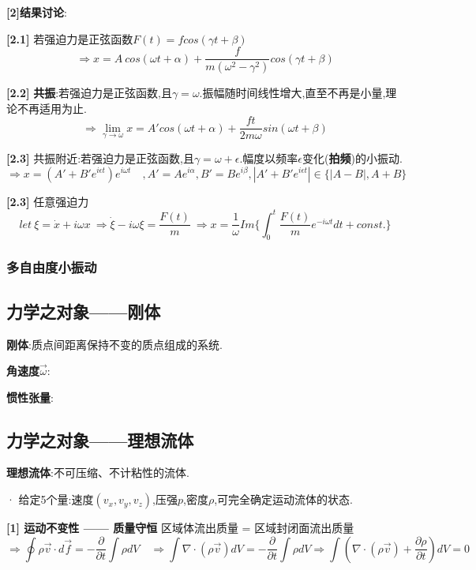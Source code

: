 \documentclass{article}
\begin{document}
            \textbf{[2]结果讨论}:
            
            \textbf{[2.1]} 若强迫力是正弦函数$F(t) = f cos(\gamma t + \beta)$
                $$\Rightarrow x = A\ cos(\omega t + \alpha) + \frac{f}{m(\omega^2 - \gamma^2)} cos(\gamma t + \beta)$$
                
            \textbf{[2.2]} \textbf{共振}:若强迫力是正弦函数,且$\gamma = \omega$.\quad 振幅随时间线性增大,直至不再是小量,理论不再适用为止.
            $$\Rightarrow \lim_{\gamma \to \omega}x = A'cos(\omega t + \alpha) + \frac{f t}{2m\omega} sin(\omega t + \beta)$$
            
            \textbf{[2.3]} 共振附近:若强迫力是正弦函数,且$\gamma = \omega + \epsilon$.\quad 幅度以频率$\epsilon$变化(\textbf{拍频})的小振动.
            $$\Rightarrow x = (A' + B' e^{i\epsilon t})e^{i\omega t} \quad ,A' = Ae^{i\alpha},B' = Be^{i\beta},|A' + B' e^{i\epsilon t}| \in \{|A-B|,A+B\} $$
            
            \textbf{[2.3]} 任意强迫力
            $$let\ \xi = \dot x + i\omega x\ \Rightarrow \dot \xi - i\omega \xi = \frac{F(t)}{m}  \ \Rightarrow x = \frac{1}{\omega}Im\{\int_0^t \frac{F(t)}{m}e^{-i\omega t}dt + const.\}$$


\subsubsection{多自由度小振动}


    \subsection{力学之对象——刚体}
        \textbf{刚体}:质点间距离保持不变的质点组成的系统.
        
        \textbf{角速度$\vec \omega$}:
        
        \textbf{惯性张量}:
    
    
    
    \subsection{力学之对象——理想流体}
        \textbf{理想流体}:不可压缩、不计粘性的流体.
        
        · 给定5个量:速度$(v_x,v_y,v_z)$,压强$p$,密度$\rho$,可完全确定运动流体的状态.
        
        \textbf{[1] 运动不变性 —— 质量守恒}
            区域体流出质量 = 区域封闭面流出质量
            $$\Rightarrow \oint \rho \vec v \cdot d \vec f = -\frac{\partial}{\partial t}\int \rho dV \quad \Rightarrow \int \nabla \cdot (\rho \vec v) dV  = -\frac{\partial}{\partial t}\int \rho dV \Rightarrow  \int (\nabla \cdot (\rho \vec v) + \frac{\partial \rho}{\partial t}) dV  = 0$$
        
\end{document}
